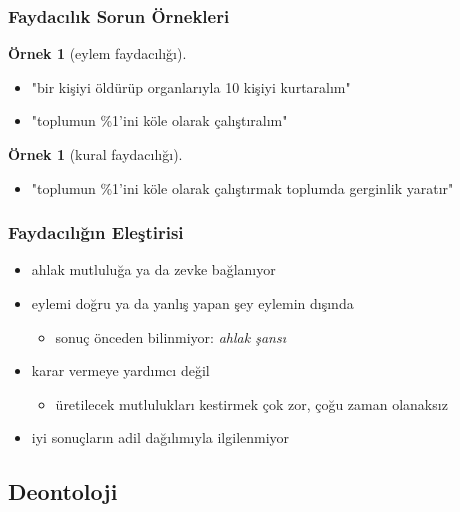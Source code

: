\documentclass[dvipsnames]{beamer}
\theoremstyle{definition}
\theoremstyle{example}
\newtheorem{ornek}[theorem]{Örnek}
\theoremstyle{plain}
\begin{document}
\begin{frame}
  \frametitle{Faydacılık Sorun Örnekleri}

  \begin{ornek}[eylem faydacılığı]
    \begin{itemize}
      \item "bir kişiyi öldürüp organlarıyla 10 kişiyi kurtaralım"
      \item "toplumun \%1'ini köle olarak çalıştıralım"
    \end{itemize}
  \end{ornek}

  \pause
  \begin{ornek}[kural faydacılığı]
    \begin{itemize}
      \item "toplumun \%1'ini köle olarak çalıştırmak toplumda
        gerginlik yaratır"
    \end{itemize}
  \end{ornek}
\end{frame}

\begin{frame}
  \frametitle{Faydacılığın Eleştirisi}

  \begin{itemize}
    \item ahlak mutluluğa ya da zevke bağlanıyor

    \pause
    \item eylemi doğru ya da yanlış yapan şey eylemin dışında

    \begin{itemize}
      \item sonuç önceden bilinmiyor: \emph{ahlak şansı}
    \end{itemize}

    \pause
    \item karar vermeye yardımcı değil

    \begin{itemize}
      \item üretilecek mutlulukları kestirmek çok zor, çoğu zaman olanaksız
    \end{itemize}

    \pause
    \item iyi sonuçların adil dağılımıyla ilgilenmiyor
  \end{itemize}
\end{frame}

\subsection{Deontoloji}
\end{document}
